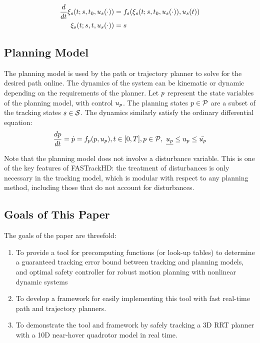 \begin{equation}
\label{eq:fdyn_traj}
\begin{aligned}
\frac{d}{dt}\xi_{s}(t; s, t_0, u_s(\cdot)) &= f_s(\xi_{s}(t; s, t_0, u_s(\cdot)), u_s(t)) \\
\xi_{s}(t; s, t, u_s(\cdot)) &= s
\end{aligned}
\end{equation}

\subsection{Planning Model}
The planning model is used by the path or trajectory planner to solve for the desired path online. The dynamics of the system can be kinematic or dynamic depending on the requirements of the planner. Let $p$ represent the state variables of the planning model, with control $u_p$. The planning states $p \in \mathcal{P}$ are a subset of the tracking states $s \in \mathcal{S}$. The dynamics similarly satisfy the ordinary differential equation:
\begin{equation}
\begin{aligned}
\label{eq:pdyn}
\frac{dp}{dt} = \dot{p} = f_p(p, u_p), t \in [0, T], p \in \mathcal{P}, \ \underline{u_p} \leq u_p \leq \bar{u_p}
\end{aligned}
\end{equation}

Note that the planning model does not involve a disturbance variable. This is one of the key features of FASTrackHD: the treatment of disturbances is only necessary in the tracking model, which is modular with respect to any planning method, including those that do not account for disturbances.

\subsection{Goals of This Paper}
The goals of the paper are threefold: 
\begin{enumerate}
	\item To provide a tool for precomputing functions (or look-up tables) to determine a guaranteed tracking error bound between tracking and planning models, and optimal safety controller for robust motion planning with nonlinear dynamic systems
	\item To develop a framework for easily implementing this tool with fast real-time path and trajectory planners.
	\item To demonstrate the tool and framework by safely tracking a 3D RRT planner with a 10D near-hover quadrotor model in real time. 
\end{enumerate}
